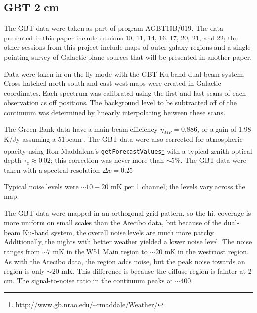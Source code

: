 \subsection{GBT 2 cm}
The GBT data were taken as part of program AGBT10B/019.  
The data presented in this paper
include sessions 10, 11, 14, 16, 17, 20, 21, and 22; the other sessions from
this project include maps of outer galaxy regions and a single-pointing survey
of Galactic plane sources that will be presented in another paper. 

Data were taken in on-the-fly mode with the GBT Ku-band dual-beam system.
Cross-hatched north-south and east-west maps were created in Galactic
coordinates. 
Each spectrum was calibrated using the first and last scans of each observation
as off positions.  The background level to be subtracted off of the
continuum was determined by linearly interpolating between these scans.


The Green Bank data have a main beam efficiency $\eta_{MB} = 0.886$, or a gain
of 1.98 K/Jy assuming a 51\arcsec beam \citep[see][for additional
discussion]{Mangum2013a}.  The GBT data were also corrected for atmospheric
opacity using Ron Maddalena's
\texttt{getForecastValues}\footnote{\url{http://www.gb.nrao.edu/~rmaddale/Weather/}}
with a typical zenith optical depth $\tau_{z}\approx0.02$; this
correction was never more than $\sim5\%$.
The GBT data were taken with a spectral resolution $\Delta v = 0.25$ \kms

Typical noise levels were $\sim10-20$ mK per 1 \kms channel; the levels vary
across the map.  

The GBT data were mapped in an orthogonal grid pattern, so the hit coverage is
more uniform on small scales than the Arecibo data, but because of the
dual-beam Ku-band system, the overall noise levels are much more patchy.
Additionally, the nights with
better weather yielded a lower noise level.  The noise ranges from $\sim7$ mK
in the W51 Main region to $\sim 20$ mK in the westmost region.  As with the
Arecibo data, the \hii region adds noise, but the peak noise towards an \hii
region is only $\sim 20$ mK.  This difference is because the diffuse \hii
region is fainter at 2 cm.  The signal-to-noise ratio in the continuum peaks at
$\sim 400$.

